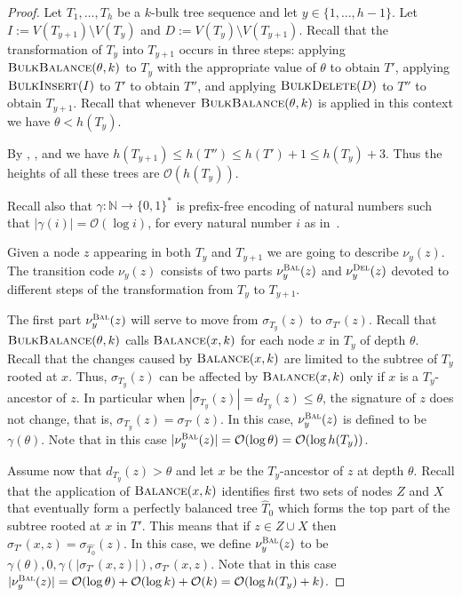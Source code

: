 \documentclass[kpfonts]{patmorin}
\newcommand{\Oh}{\mathcal{O}}
\let\leq\leqslant
\begin{document}
\begin{proof}
  Let $T_1,\ldots,T_h$ be a $k$-bulk tree sequence and let $y\in\{1,\ldots,h-1\}$. Let $I:=V(T_{y+1})\setminus V(T_y)$ and $D:=V(T_y) \setminus V(T_{y+1})$.
  Recall that the transformation of $T_{y}$ into $T_{y+1}$ occurs in three steps:
  applying $\textsc{BulkBalance}(\theta,k)$ to $T_y$ with the appropriate value of $\theta$ to obtain $T'$,
  applying $\textsc{BulkInsert}(I)$ to $T'$ to obtain $T''$, and
  applying $\textsc{BulkDelete}(D)$ to $T''$ to obtain $T_{y+1}$.
  Recall that whenever $\textsc{BulkBalance}(\theta,k)$ is applied in this context we have $\theta < h(T_y)$.

  By , , and  we have  $h(T_{y+1}) \leq h(T'') \leq h(T')+1 \leq h(T_y)+3$.
  Thus the heights of all these trees are $\Oh(h(T_y))$.

  Recall also that $\gamma:\mathbb{N}\to\{0,1\}^*$ is prefix-free encoding of natural numbers such that $|\gamma(i)|=\Oh(\log i)$, for every natural number $i$ as in~.

  Given a node $z$ appearing in both $T_y$ and $T_{y+1}$ we are going to describe $\nu_y(z)$.
  The transition code $\nu_y(z)$ consists of two parts $\nu_y^{\textsc{Bal}}(z)$ and $\nu_y^{\textsc{Del}}(z)$ devoted to different steps of the transformation from $T_y$ to $T_{y+1}$.

  The first part $\nu_y^{\textsc{Bal}}(z)$ will serve to move from $\sigma_{T_y}(z)$ to $\sigma_{T'}(z)$.
  Recall that $\textsc{BulkBalance}(\theta,k)$ calls $\textsc{Balance}(x,k)$ for each node $x$ in $T_y$ of depth $\theta$.
  Recall that the changes caused by $\textsc{Balance}(x,k)$ are limited to the subtree of $T_y$ rooted at $x$.
  Thus, $\sigma_{T_y}(z)$ can be affected by $\textsc{Balance}(x,k)$ only if $x$ is a $T_y$-ancestor of $z$.
  In particular when $|\sigma_{T_y}(z)| = d_{T_y}(z) \leq \theta$, the signature of $z$ does not change, that is, $\sigma_{T_y}(z)=\sigma_{T'}(z)$. In this case,  $\nu_y^{\textsc{Bal}}(z)$ is defined to be $\gamma(\theta)$.
  Note that in this case $|\nu^{\textsc{Bal}}_y(z)|=\Oh(\log\theta) = \Oh(\log h(T_y))$.

  Assume now that $d_{T_y}(z) > \theta$ and let $x$ be the $T_y$-ancestor of $z$ at depth $\theta$.
  Recall that the application of $\textsc{Balance}(x,k)$ identifies first two sets of nodes $Z$ and $X$ that eventually form a perfectly balanced tree $\hat{T}_0$ which forms the top part of the subtree rooted at $x$ in $T'$.
  This means that if $z\in Z\cup X$ then $\sigma_{T'}(x,z) =\sigma_{\hat{T_0}}(z)$.
  In this case, we define $\nu_y^{\textsc{Bal}}(z)$ to be $\gamma(\theta),0,\gamma(|\sigma_{T'}(x,z)|),\sigma_{T'}(x,z)$.
  Note that in this case $|\nu^{\textsc{Bal}}_y(z)|=\Oh(\log\theta) + \Oh(\log k) + \Oh(k) = \Oh(\log h(T_y) + k)$.


\end{proof}
\end{document}
